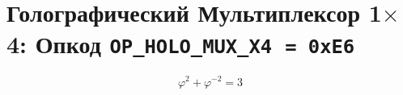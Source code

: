 %

\theoremstyle{plain}
\newtheorem{theorem}{Теорема}[chapter]
\newtheorem{lemma}[theorem]{Лемма}
\newtheorem{corollary}[theorem]{Следствие}
\newtheorem{definition}{Определение}[chapter]
\newtheorem{remark}{Замечание}[chapter]
\newtheorem{proposition}[theorem]{Утверждение}

\chapter{Голографический Мультиплексор 1$\times$4: Опкод
  \texttt{OP\_HOLO\_MUX\_X4}~\texttt{=~0xE6}}%
\label{ch:glava85-holo-mux-x4}

%
\[
  \varphi^{2} + \varphi^{-2} = 3
\]

